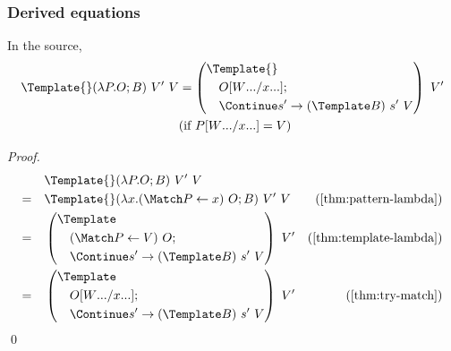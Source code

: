 \subsubsection{Derived equations}

\begin{lemma}
  \label{thm:template-match}
  In the source,
  \begin{align*}
    \Template{} (\lambda P. O; B) ~ V' ~ V
    &=
      \left(
        \begin{aligned}
          &\Template{} \\
          &\quad O\subst{\many{x}}{\many{W}}; \\
          &\quad \Continue s' \to (\Template B) ~ s' ~ V
        \end{aligned}
      \right)
      ~ V'
    \\
    &
    (\text{if } P\subst{\many{x}}{\many{W}} = V)
  \end{align*}
\end{lemma}
\begin{proof}
  \begin{align*}
    &\quad
    \Template{} (\lambda P. O; B) ~ V' ~ V
    \\
    =&\quad
    \Template{} (\lambda x. (\Match P \gets x) ~ O; B) ~ V' ~ V
    &(\cref{thm:pattern-lambda})
    \\
    =&\quad
    \left(
      \begin{aligned}
        &\Template \\
        &\quad (\Match P \gets V) ~ O; \\
        &\quad \Continue s' \to (\Template B) ~ s' ~ V
      \end{aligned}
    \right)
    ~ V'
    &(\cref{thm:template-lambda})
    \\
    =&\quad
    \left(
      \begin{aligned}
        &\Template \\
        &\quad O\subst{\many{x}}{\many{W}}; \\
        &\quad \Continue s' \to (\Template B) ~ s' ~ V
      \end{aligned}
    \right)
    ~ V'
    &(\cref{thm:try-match})
  \end{align*}
  \qed
\end{proof}

